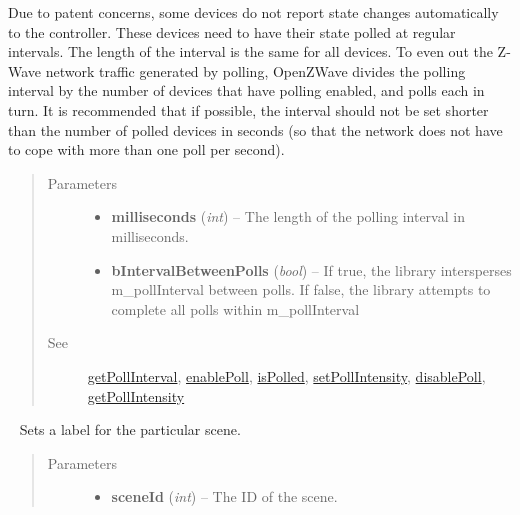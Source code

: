\documentclass[letterpaper,10pt,english]{sphinxmanual}
\begin{document}
\begin{fulllineitems}
\begin{fulllineitems}
Due to patent concerns, some devices do not report state changes automatically
to the controller.  These devices need to have their state polled at regular
intervals.  The length of the interval is the same for all devices.  To even
out the Z-Wave network traffic generated by polling, OpenZWave divides the
polling interval by the number of devices that have polling enabled, and polls
each in turn.  It is recommended that if possible, the interval should not be
set shorter than the number of polled devices in seconds (so that the network
does not have to cope with more than one poll per second).
\begin{quote}\begin{description}
\item[{Parameters}] \leavevmode\begin{itemize}
\item {} 
\textbf{milliseconds} (\emph{int}) -- The length of the polling interval in milliseconds.

\item {} 
\textbf{bIntervalBetweenPolls} (\emph{bool}) -- If true, the library intersperses m\_pollInterval between polls.
If false, the library attempts to complete all polls within m\_pollInterval

\end{itemize}

\item[{See}] \leavevmode
{\hyperref[libopenzwave:getpollinterval]{getPollInterval}}, {\hyperref[libopenzwave:enablepoll]{enablePoll}}, {\hyperref[libopenzwave:ispolled]{isPolled}}, {\hyperref[libopenzwave:setpollintensity]{setPollIntensity}}, {\hyperref[libopenzwave:disablepoll]{disablePoll}}, {\hyperref[libopenzwave:getpollintensity]{getPollIntensity}}

\end{description}\end{quote}

\end{fulllineitems}


\begin{fulllineitems}
\label{libopenzwave:libopenzwave.PyManager.setSceneLabel}~\label{libopenzwave:setscenelabel}
Sets a label for the particular scene.
\begin{quote}\begin{description}
\item[{Parameters}] \leavevmode\begin{itemize}
\item {} 
\textbf{sceneId} (\emph{int}) -- The ID of the scene.


\end{itemize}
\end{description}
\end{quote}
\end{fulllineitems}
\end{fulllineitems}
\end{document}
